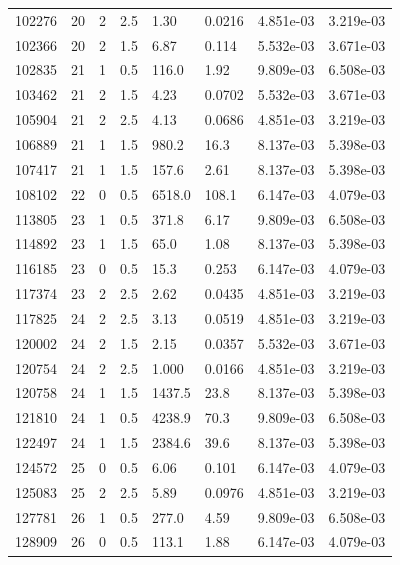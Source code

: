 \documentclass[preview]{standalone}
\begin{document}
{{{\begin{tabular}{L{1.2cm}C{1.2cm} C{0.3cm}C{0.5cm} C{1.4cm}C{1.4cm} C{1.4cm}C{1.4cm}}
  102276  &    20  & 2     & 2.5 &  1.30  & 0.0216  & 4.851e-03 &  3.219e-03   \\ 
  102366  &    20  & 2     & 1.5 &  6.87  & 0.114  & 5.532e-03 &  3.671e-03   \\ 
  102835  &    21  & 1     & 0.5 &  116.0  & 1.92  & 9.809e-03 &  6.508e-03   \\ 
  103462  &    21  & 2     & 1.5 &  4.23  & 0.0702  & 5.532e-03 &  3.671e-03   \\ 
  105904  &    21  & 2     & 2.5 &  4.13  & 0.0686  & 4.851e-03 &  3.219e-03   \\ 
  106889  &    21  & 1     & 1.5 &  980.2  & 16.3  & 8.137e-03 &  5.398e-03   \\ 
  107417  &    21  & 1     & 1.5 &  157.6  & 2.61  & 8.137e-03 &  5.398e-03   \\ 
  108102  &    22  & 0     & 0.5 &  6518.0  & 108.1  & 6.147e-03 &  4.079e-03   \\ 
  113805  &    23  & 1     & 0.5 &  371.8  & 6.17  & 9.809e-03 &  6.508e-03   \\ 
  114892  &    23  & 1     & 1.5 &  65.0  & 1.08  & 8.137e-03 &  5.398e-03   \\ 
  116185  &    23  & 0     & 0.5 &  15.3  & 0.253  & 6.147e-03 &  4.079e-03   \\ 
  117374  &    23  & 2     & 2.5 &  2.62  & 0.0435  & 4.851e-03 &  3.219e-03   \\ 
  117825  &    24  & 2     & 2.5 &  3.13  & 0.0519  & 4.851e-03 &  3.219e-03   \\ 
  120002  &    24  & 2     & 1.5 &  2.15  & 0.0357  & 5.532e-03 &  3.671e-03   \\ 
  120754  &    24  & 2     & 2.5 &  1.000  & 0.0166  & 4.851e-03 &  3.219e-03   \\ 
  120758  &    24  & 1     & 1.5 &  1437.5  & 23.8  & 8.137e-03 &  5.398e-03   \\ 
  121810  &    24  & 1     & 0.5 &  4238.9  & 70.3  & 9.809e-03 &  6.508e-03   \\ 
  122497  &    24  & 1     & 1.5 &  2384.6  & 39.6  & 8.137e-03 &  5.398e-03   \\ 
  124572  &    25  & 0     & 0.5 &  6.06  & 0.101  & 6.147e-03 &  4.079e-03   \\ 
  125083  &    25  & 2     & 2.5 &  5.89  & 0.0976  & 4.851e-03 &  3.219e-03   \\ 
  127781  &    26  & 1     & 0.5 &  277.0  & 4.59  & 9.809e-03 &  6.508e-03   \\ 
  128909  &    26  & 0     & 0.5 &  113.1  & 1.88  & 6.147e-03 &  4.079e-03   \\ 

\end{tabular}}}}
\end{document}
